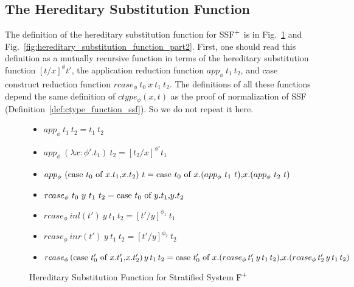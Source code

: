 \subsection{The Hereditary Substitution Function}
\label{sec:the_hereditary_substitution_function_ssfp}

The definition of the hereditary substitution function for SS$\mbox{F}^{+}$ is
in Fig.~\ref{fig:hereditary_substitution_function_part1} and
Fig.~\ref{fig:hereditary_substitution_function_part2}.  First, one
should read this definition as a mutually recursive function in terms
of the hereditary substitution function $[t/x]^\phi t'$, the
application reduction function $app_\phi\ t_1\ t_2$, and case
construct reduction function $rcase_\phi\ t_0\ x\ t_1\ t_2$.  The
definitions of all these functions depend the same definition of
$ctype_\phi(x, t)$ as the proof of normalization of SSF
(Definition~\ref{def:ctype_function_ssf}).  So we do not repeat it
here.
\begin{figure} 
  \small
  \begin{itemize}
  \item[] $app_\phi\ t_1\ t_2 = t_1\ t_2$
    
  \item[] $app_\phi\ (\lambda x:\phi'.t_1)\ t_2 = [t_2/x]^{\phi'} t_1$
  \item[] $app_\phi\ (\ccon{t_0}{x}{t_1}{t_2})\ t = 
    \ccon{t_0}{x}{(app_\phi\ t_1\ t)}{(app_\phi\ t_2\ t)}$
  \end{itemize}
  
  \begin{itemize}
  \item[] $rcase_{\phi}\ t_0\ y\ t_1\ t_2 = \mbox{case}\ t_0\ \text{of}\ y\text{.}t_1\text{,}y\text{.}t_2$
  \item[] $rcase_{\phi}\ inl(t')\ y\ t_1\ t_2 = [t'/y]^{\phi_1}\ t_1$
  \item[] $rcase_{\phi}\ inr(t')\ y\ t_1\ t_2 = [t'/y]^{\phi_2}\ t_2$
  \item[] $rcase_{\phi}\,(\mbox{case}\ t'_0\ \text{of}\ x\text{.}t'_1\text{,}x\text{.}t'_2)\,y\,t_1\,t_2 = 
    \mbox{case}\ t'_0\ \text{of}\ x\text{.}(rcase_{\phi}\,t'_1\,y\,t_1\,t_2)\text{,}x\text{.}(rcase_{\phi}\,t'_2\,y\,t_1\,t_2)$
  \end{itemize}
  \caption{Hereditary Substitution Function for Stratified System $\mbox{F}^{+}$}
  \label{fig:hereditary_substitution_function_part1}
\end{figure}


